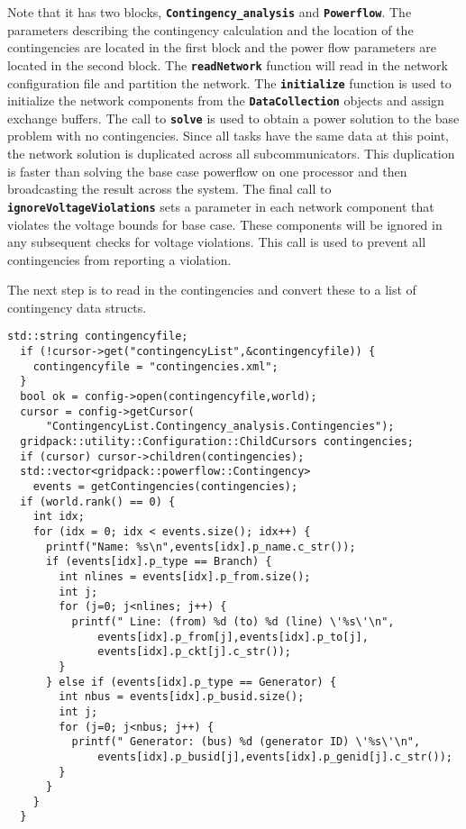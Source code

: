 Note that it has two blocks, \texttt{\textbf{Contingency\_analysis}} and
\texttt{\textbf{Powerflow}}. The parameters describing the contingency
calculation and the location of the contingencies are located in the first block
and the power flow parameters are located in the second block. The
\texttt{\textbf{readNetwork}} function will read in the network configuration
file and partition the network. The \texttt{\textbf{initialize}} function is
used to initialize the network components from the
\texttt{\textbf{DataCollection}} objects and assign exchange buffers. The call
to \texttt{\textbf{solve}} is used to obtain a power solution to the base
problem with no contingencies. Since all tasks have the same data at this point,
the network solution is duplicated across all subcommunicators. This duplication
is faster than solving the base case powerflow on one processor and then
broadcasting the result across the system. The final call to
\texttt{\textbf{ignoreVoltageViolations}} sets a parameter in each network
component that violates the voltage bounds for base case. These components will
be ignored in any subsequent checks for voltage violations. This call is used to
prevent all contingencies from reporting a violation.

The next step is to read in the contingencies and convert these to a list of contingency data structs.

{
\color{red}
\begin{Verbatim}[fontseries=b]
  std::string contingencyfile;
  if (!cursor->get("contingencyList",&contingencyfile)) {
    contingencyfile = "contingencies.xml";
  }
  bool ok = config->open(contingencyfile,world);
  cursor = config->getCursor(
      "ContingencyList.Contingency_analysis.Contingencies");
  gridpack::utility::Configuration::ChildCursors contingencies;
  if (cursor) cursor->children(contingencies);
  std::vector<gridpack::powerflow::Contingency>
    events = getContingencies(contingencies);
  if (world.rank() == 0) {
    int idx;
    for (idx = 0; idx < events.size(); idx++) {
      printf("Name: %s\n",events[idx].p_name.c_str());
      if (events[idx].p_type == Branch) {
        int nlines = events[idx].p_from.size();
        int j;
        for (j=0; j<nlines; j++) {
          printf(" Line: (from) %d (to) %d (line) \'%s\'\n",
              events[idx].p_from[j],events[idx].p_to[j],
              events[idx].p_ckt[j].c_str());
        }
      } else if (events[idx].p_type == Generator) {
        int nbus = events[idx].p_busid.size();
        int j;
        for (j=0; j<nbus; j++) {
          printf(" Generator: (bus) %d (generator ID) \'%s\'\n",
              events[idx].p_busid[j],events[idx].p_genid[j].c_str());
        }
      }
    }
  }
\end{Verbatim}
}

